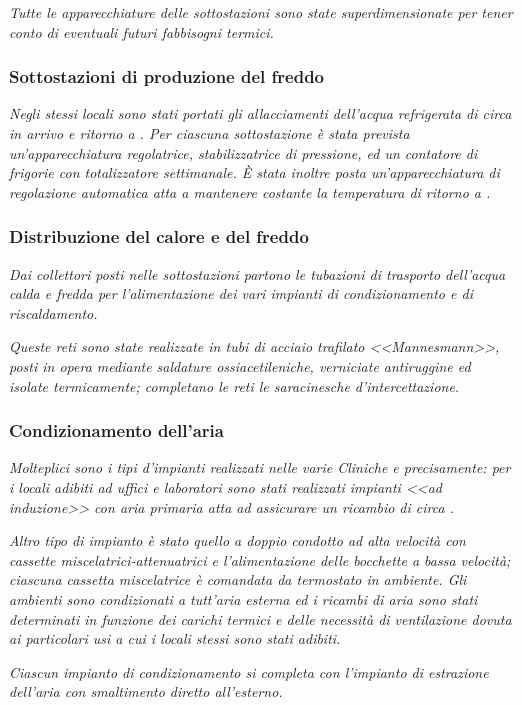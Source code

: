 \begin{quoting}
	\emph{Tutte le apparecchiature delle sottostazioni sono state superdimensionate per tener conto di eventuali futuri fabbisogni termici.}
	\subsubsection{Sottostazioni di produzione del freddo}
	\emph{Negli stessi locali sono stati portati gli allacciamenti dell'acqua refrigerata di circa  in arrivo e ritorno a . Per ciascuna sottostazione è stata prevista un'apparecchiatura regolatrice, stabilizzatrice di pressione, ed un contatore di frigorie con totalizzatore settimanale. È stata inoltre posta un'apparecchiatura di regolazione automatica atta a mantenere costante la temperatura di ritorno a .}

	\sdots
	\subsubsection{Distribuzione del calore e del freddo}
	\emph{Dai collettori posti nelle sottostazioni partono le tubazioni di trasporto dell'acqua calda e fredda per l'alimentazione dei vari impianti di condizionamento e di riscaldamento.}
	
	\emph{Queste reti sono state realizzate in tubi di acciaio trafilato <<Mannesmann>>, posti in opera mediante saldature ossiacetileniche, verniciate antiruggine ed isolate termicamente; completano le reti le saracinesche d'intercettazione.}
	\subsubsection{Condizionamento dell'aria}
	\emph{Molteplici sono i tipi d'impianti realizzati nelle varie Cliniche e precisamente: per i locali adibiti ad uffici e laboratori sono stati realizzati impianti <<ad induzione>> con aria primaria atta ad assicurare un ricambio di circa .}
	
	\emph{Altro tipo di impianto è stato quello a doppio condotto ad alta velocità con cassette miscelatrici-attenuatrici e l'alimentazione delle bocchette a bassa velocità; ciascuna cassetta miscelatrice è comandata da termostato in ambiente. Gli ambienti sono condizionati a tutt'aria esterna ed i ricambi di aria sono stati determinati in funzione dei carichi termici e delle necessità di ventilazione dovuta ai particolari usi a cui i locali stessi sono stati adibiti.}

	\emph{Ciascun impianto di condizionamento si completa con l'impianto di estrazione dell'aria con smaltimento diretto all'esterno.}
	

\end{quoting}
